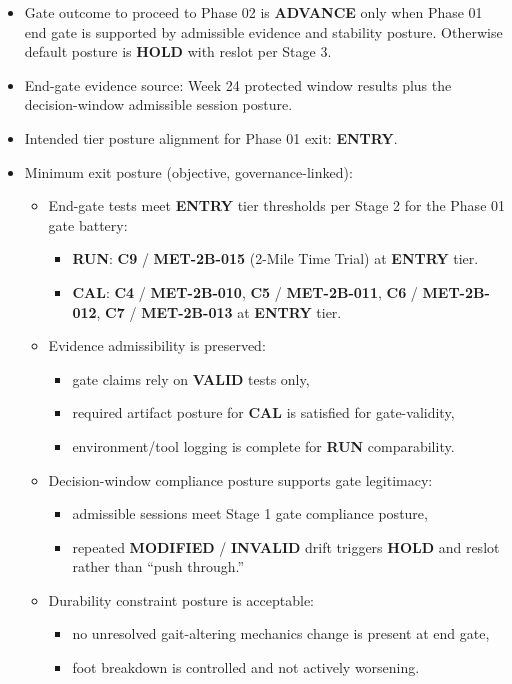 \documentclass[10pt]{article}
\begin{document}
\begin{itemize}
\item Gate outcome to proceed to Phase 02 is \textbf{ADVANCE} only when Phase 01 end gate is supported by admissible evidence and stability posture. Otherwise default posture is \textbf{HOLD} with reslot per Stage 3.
\item End-gate evidence source: Week 24 protected window results plus the decision-window admissible session posture.
\item Intended tier posture alignment for Phase 01 exit: \textbf{ENTRY}.
\item Minimum exit posture (objective, governance-linked):
\begin{itemize}
\item End-gate tests meet \textbf{ENTRY} tier thresholds per Stage 2 for the Phase 01 gate battery:
\begin{itemize}
\item \textbf{RUN}: \textbf{C9} / \textbf{MET-2B-015} (2-Mile Time Trial) at \textbf{ENTRY} tier.
\item \textbf{CAL}: \textbf{C4} / \textbf{MET-2B-010}, \textbf{C5} / \textbf{MET-2B-011}, \textbf{C6} / \textbf{MET-2B-012}, \textbf{C7} / \textbf{MET-2B-013} at \textbf{ENTRY} tier.
\end{itemize}
\item Evidence admissibility is preserved:
\begin{itemize}
\item gate claims rely on \textbf{VALID} tests only,
\item required artifact posture for \textbf{CAL} is satisfied for gate-validity,
\item environment/tool logging is complete for \textbf{RUN} comparability.
\end{itemize}
\item Decision-window compliance posture supports gate legitimacy:
\begin{itemize}
\item admissible sessions meet Stage 1 gate compliance posture,
\item repeated \textbf{MODIFIED} / \textbf{INVALID} drift triggers \textbf{HOLD} and reslot rather than “push through.”
\end{itemize}
\item Durability constraint posture is acceptable:
\begin{itemize}
\item no unresolved gait-altering mechanics change is present at end gate,
\item foot breakdown is controlled and not actively worsening.
\end{itemize}
\end{itemize}
\end{itemize}
\end{document}
